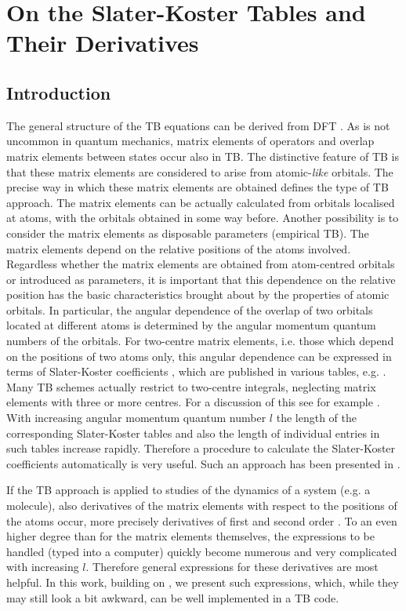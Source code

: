 \chapter{On the Slater-Koster Tables and Their Derivatives}
\label{ch:two}
%
%
\section{Introduction}
\par{The general structure of the TB
equations can be derived from DFT \citep{Finnis03,Foulkes89,Frauenheim00}.
As is not uncommon in quantum mechanics, matrix elements of
operators and overlap matrix elements between states occur also in TB.
The distinctive feature of TB is that these matrix elements are considered to arise from atomic-{\it like}
orbitals. The precise way in which these matrix elements are obtained defines the type of TB approach.
The matrix elements can be actually calculated from orbitals localised at atoms, with the orbitals obtained
in some way before. Another possibility is to consider the matrix elements as disposable parameters
(empirical TB). The matrix elements depend on the relative positions of the atoms involved. Regardless whether
the matrix elements are obtained from atom-centred orbitals or introduced as parameters, it is important that
this dependence on the relative position has the basic characteristics brought about by the properties of
atomic orbitals. In particular, the angular dependence of the overlap of two orbitals located at different
atoms is determined by the angular momentum quantum numbers of the orbitals. For two-centre matrix elements,
i.e. those which depend on the positions of two atoms only, this angular dependence can be expressed in terms
of Slater-Koster coefficients \citep{Slater54}, which are published in various
tables, e.g. \citep{Slater54,Sharma79,Sharma80,Sharma80b}. Many TB schemes
actually restrict to two-centre integrals, neglecting matrix elements with three or more centres. For a
discussion of this see for example \citep{Finnis03}.
With increasing angular momentum quantum number $l$ the length of the corresponding Slater-Koster tables and
also the length of individual entries in such tables increase rapidly. Therefore a procedure to calculate
the Slater-Koster coefficients automatically is very useful. Such an approach has been presented in
\citep{Sharma80b,Kollar94,Podolskiy04}.}
\par{If the TB approach is applied to studies of the dynamics of a system (e.g. a molecule), also derivatives of the
matrix elements with respect to the positions of the atoms occur, more precisely derivatives of first and
second order \citep{Todorov01}.
To an even higher degree than for the matrix elements themselves, the expressions to
be handled (typed into a computer) quickly become numerous and very complicated with increasing $l$.
Therefore general expressions for these derivatives are most helpful. In this work, building on
\citep{Podolskiy04}, we
present such expressions, which, while they may still look a bit awkward, can be well implemented in a
TB code.}
